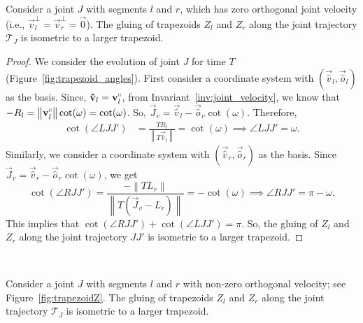 \begin{lemma}
\label{lem:trapezoid_gluing_parallel}
Consider a joint $J$ with segments $l$ and $r$,
which has zero orthogonal joint velocity (i.e., $\vec v_l^\perp = \vec v_r^\perp = \vec 0$).
The gluing of trapezoids $Z_l$ and $Z_r$ along the joint trajectory $\mathcal T_J$ is isometric to a larger trapezoid.
\end{lemma}
\begin{proof}
We consider the evolution of joint $J$ for time $T$ (Figure~\ref{fig:trapezoid_angles}).
First consider a coordinate system with $(\vec{\hat v}_l, \vec{\hat o}_l)$ as the basis.
Since, $\vec{\hat v}_l = \vec v_l^\shortparallel$, from Invariant~\ref{inv:joint_velocity},
we know that $-R_l = \left\| \vec v_l^\shortparallel\right\|\cot(\omega) = \cot(\omega)$.
So, $\vec J_v = \vec{\hat v}_l - \vec{\hat o}_v\cot(\omega)$.  Therefore,
\begin{align*}
    \cot(\angle LJJ') &= \frac{T R_l}{ \left\| T\vec{\hat v}_l\right\|} = \cot(\omega)
    \implies \angle LJJ' = \omega.
\end{align*}
Similarly, we consider a coordinate system with $(\vec{\hat v}_r, \vec{\hat o}_r)$ as the basis.
Since $\vec J_v = \vec{\hat v}_r - \vec{\hat o}_r \cot(\omega)$, we get
$$
\cot(\angle RJJ') = \frac{-\left\| T L_r\right\|}{ \left\| T(\vec J_v - L_r)\right\|} = -\cot(\omega)
\implies \angle RJJ' = \pi - \omega.
$$
This implies that $\cot(\angle RJJ') + \cot(\angle LJJ') = \pi$.
So, the gluing of $Z_l$ and $Z_r$ along the joint trajectory $JJ'$ is isometric to a larger trapezoid.
\end{proof}



~
\vspace*{-4ex}

\begin{lemma}
\label{lem:trapezoid_gluing}
Consider a joint $J$ with segments $l$ and $r$ with non-zero orthogonal velocity; see Figure~\ref{fig:trapezoidZ}.
The gluing of trapezoids $Z_l$ and $Z_r$ along the joint trajectory $\mathcal T_J$ is isometric to a larger trapezoid.
\end{lemma}

